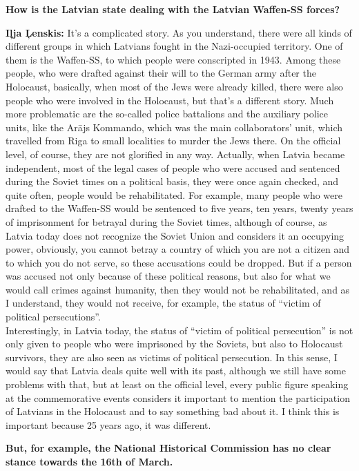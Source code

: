\textbf{How is the Latvian state dealing with the Latvian Waffen-SS forces?}

\textbf{Iļja Ļenskis:} It’s a complicated story. As you understand, there were all kinds of different groups in which Latvians fought in the Nazi-occupied territory. One of them is the Waffen-SS, to which people were conscripted in 1943. Among these people, who were drafted against their will to the German army after the Holocaust, basically, when most of the Jews were already killed, there were also people who were involved in the Holocaust, but that’s a different story. Much more problematic are the so-called police battalions and the auxiliary police units, like the Arājs Kommando, which was the main collaborators’ unit, which travelled from Riga to small localities to murder the Jews there. On the official level, of course, they are not glorified in any way. Actually, when Latvia became independent, most of the legal cases of people who were accused and sentenced during the Soviet times on a political basis, they were once again checked, and quite often, people would be rehabilitated. For example, many people who were drafted to the Waffen-SS would be sentenced to five years, ten years, twenty years of imprisonment for betrayal during the Soviet times, although of course, as Latvia today does not recognize the Soviet Union and considers it an occupying power, obviously, you cannot betray a country of which you are not a citizen and to which you do not serve, so these accusations could be dropped. But if a person was accused not only because of these political reasons, but also for what we would call crimes against humanity, then they would not be rehabilitated, and as I understand, they would not receive, for example, the status of ``victim of political persecutions''.\\
Interestingly, in Latvia today, the status of ``victim of political persecution'' is not only given to people who were imprisoned by the Soviets, but also to Holocaust survivors, they are also seen as victims of political persecution. In this sense, I would say that Latvia deals quite well with its past, although we still have some problems with that, but at least on the official level, every public figure speaking at the commemorative events considers it important to mention the participation of Latvians in the Holocaust and to say something bad about it. I think this is important because 25 years ago, it was different. 

\textbf{But, for example, the National Historical Commission has no clear stance towards the 16th of March.}

